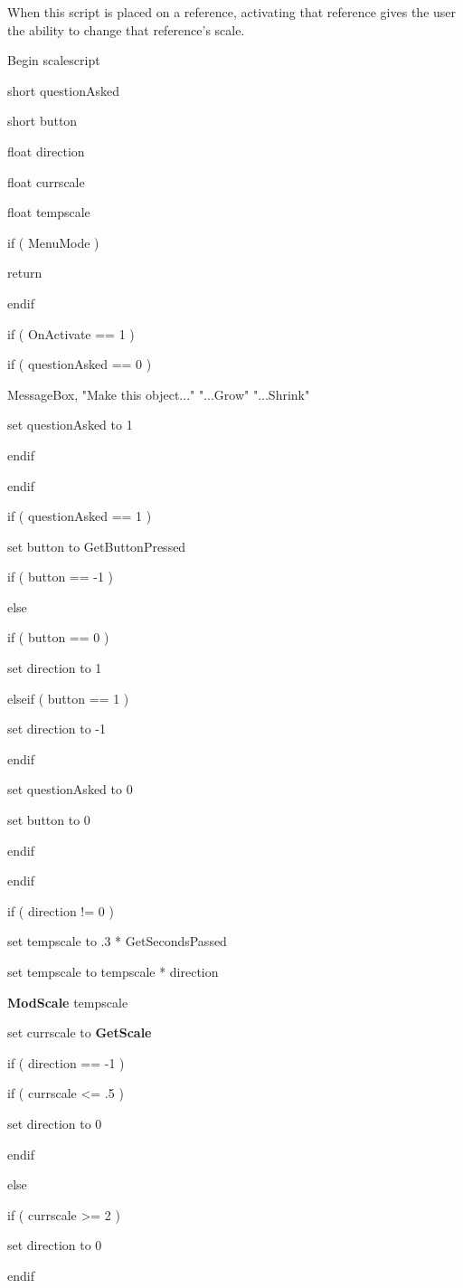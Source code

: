 \documentclass[
]{article}
\begin{document}
When this script is placed on a reference, activating that reference
gives the user the ability to change that reference's scale.

Begin scalescript

short questionAsked

short button

float direction

float currscale

float tempscale

if ( MenuMode )

return

endif

if ( OnActivate == 1 )

if ( questionAsked == 0 )

MessageBox, "Make this object..." "...Grow" "...Shrink"

set questionAsked to 1

endif

endif

if ( questionAsked == 1 )

set button to GetButtonPressed

if ( button == -1 )

else

if ( button == 0 )

set direction to 1

elseif ( button == 1 )

set direction to -1

endif

set questionAsked to 0

set button to 0

endif

endif

if ( direction != 0 )

set tempscale to .3 * GetSecondsPassed

set tempscale to tempscale * direction

\textbf{ModScale} tempscale

set currscale to \textbf{GetScale}

if ( direction == -1 )

if ( currscale \textless= .5 )

set direction to 0

endif

else

if ( currscale \textgreater= 2 )

set direction to 0

endif
\end{document}

